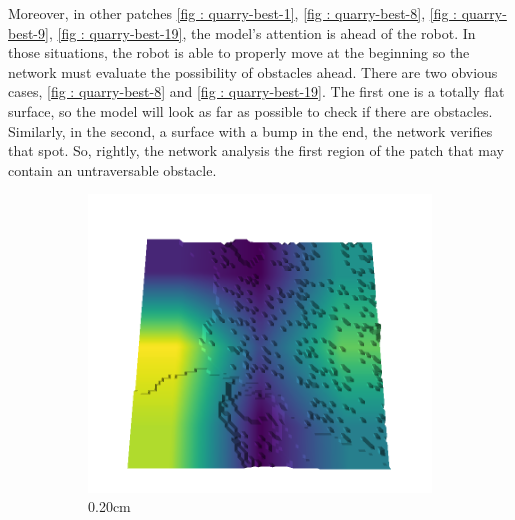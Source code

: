 Moreover, in other patches \ref{fig : quarry-best-1},  \ref{fig : quarry-best-8},  \ref{fig : quarry-best-9},  \ref{fig : quarry-best-19}, the model's  attention is ahead of the robot. In those situations, the robot is able to properly move at the beginning so the network must evaluate the possibility of obstacles ahead. There are two obvious cases, \ref{fig : quarry-best-8} and  \ref{fig : quarry-best-19}. The first one is a totally flat surface, so the model will look as far as possible to check if there are obstacles. Similarly, in the second, a surface with a bump in the end, the network verifies that spot. So, rightly, the network analysis the first region of the patch that may contain an untraversable obstacle.
\begin{figure}[H]
    \centering
    \begin{subfigure}[b]{0.192\linewidth}
    \includegraphics[width=\linewidth]{../img/5/quarry/best/20-patch-3d-majavi-colormap-0.png}
    \caption{0.20cm}
    \label{fig : quarry-best-0}
    \end{subfigure}
    \begin{subfigure}[b]{0.192\linewidth}

\end{subfigure}
\end{figure}
